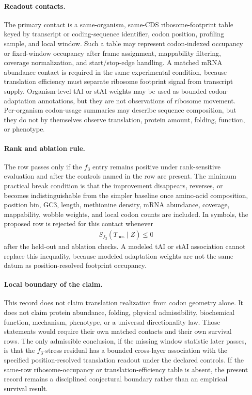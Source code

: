 \paragraph{Readout contacts.}
The primary contact is a same-organism, same-CDS ribosome-footprint table keyed by transcript or coding-sequence identifier, codon position, profiling sample, and local window.  Such a table may represent codon-indexed occupancy or fixed-window occupancy after frame assignment, mappability filtering, coverage normalization, and start/stop-edge handling.  A matched mRNA abundance contact is required in the same experimental condition, because translation efficiency must separate ribosome footprint signal from transcript supply.  Organism-level tAI or stAI weights may be used as bounded codon-adaptation annotations, but they are not observations of ribosome movement.  Per-organism codon-usage summaries may describe sequence composition, but they do not by themselves observe translation, protein amount, folding, function, or phenotype.

\paragraph{Rank and ablation rule.}
The row passes only if the $f_3$ entry remains positive under rank-sensitive evaluation and after the controls named in the row are present.  The minimum practical break condition is that the improvement disappears, reverses, or becomes indistinguishable from the simpler baseline once amino-acid composition, position bin, $\mathrm{GC3}$, length, methionine density, mRNA abundance, coverage, mappability, wobble weights, and local codon counts are included.  In symbols, the proposed row is rejected for this contact whenever
$$
\begin{aligned}
S_{f_3}(T_{\mathrm{pos}}\mid Z) \le 0
\end{aligned}
$$
after the held-out and ablation checks.  A modeled tAI or stAI association cannot replace this inequality, because modeled adaptation weights are not the same datum as position-resolved footprint occupancy.

\paragraph{Local boundary of the claim.}
This record does not claim translation realization from codon geometry alone.  It does not claim protein abundance, folding, physical admissibility, biochemical function, mechanism, phenotype, or a universal directionality law.  Those statements would require their own matched contacts and their own survival rows.  The only admissible conclusion, if the missing window statistic later passes, is that the $f_3$-stress residual has a bounded cross-layer association with the specified position-resolved translation readout under the declared controls.  If the same-row ribosome-occupancy or translation-efficiency table is absent, the present record remains a disciplined conjectural boundary rather than an empirical survival result.
